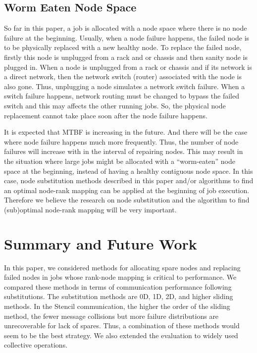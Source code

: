 \documentclass[Afour,times,sagev]{sagej}
\begin{document}
\subsection{Worm Eaten Node Space}

So far in this paper, a job is allocated with a node space where there
is no node failure at the beginning. Usually, when a node failure
happens, the failed node is to be physically replaced with a new healthy
node. To replace the failed node, firstly this node is unplugged from
a rack and or chassis and then sanity node is plugged in. When a node
is unplugged from a rack or chassis and if its network is a direct
network, then the network switch (router) associated with the node is
also gone. Thus, unplugging a node simulates a network switch
failure. When a switch failure happens, network routing must be
changed to bypass the failed switch and this may affects the other
running jobs. So, the physical node replacement cannot take place soon
after the node failure happens.

It is expected that MTBF is increasing in the future. And there will
be the case where node failure happens much more frequently. Thus, the
number of node failures will increase with in the interval of
repairing nodes. This may result in the situation where large jobs
might be allocated with a ``worm-eaten'' node space at the beginning,
instead of having a healthy contiguous node space. In this case, node
substitution methods described in this paper and/or algorithms to find
an optimal node-rank mapping can be applied at the beginning of job
execution. Therefore we believe the research on node substitution and
the algorithm to find (sub)optimal node-rank mapping will be very
important.

\section{Summary and Future Work}

In this paper, we considered methods for allocating spare nodes and
replacing failed nodes in jobs whose rank-node mapping is critical to
performance. We compared these methods in terms of
communication performance following substitutions. The substitution
methods are 0D, 1D, 2D, and higher sliding methods. In the Stencil
communication, the higher the order of the sliding method, the fewer
message collisions but more failure distributions are unrecoverable
for lack of spares. Thus, a combination of these methods would seem
to be the best strategy. We also extended the evaluation to widely
used collective operations.
\end{document}
